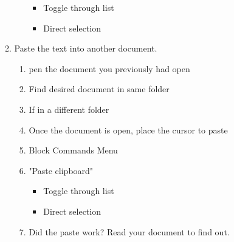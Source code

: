 \documentclass[10pt,letterpaper,twoside]{report}
\begin{document}
\begin{enumerate}
\begin{enumerate}
\begin{enumerate}
\begin{itemize}
				                  \item Toggle through list 
				                  \item Direct selection 
			                  \end{itemize}
		            \end{enumerate}
		      \item Paste the text into another document.
		            \begin{enumerate}
			            \item pen the document you previously had open 
			            \item Find desired document in same folder  
			            \item If in a different folder 
			            \item Once the document is open, place the cursor to paste 
			            \item Block Commands Menu 
			            \item "Paste clipboard"
			                  \begin{itemize}
				                  \item Toggle through list 
				                  \item Direct selection 
			                  \end{itemize}
			            \item Did the paste work? Read your document to find out.
		            \end{enumerate}
	      \end{enumerate}
\end{enumerate}
\clearpage
\end{document}
